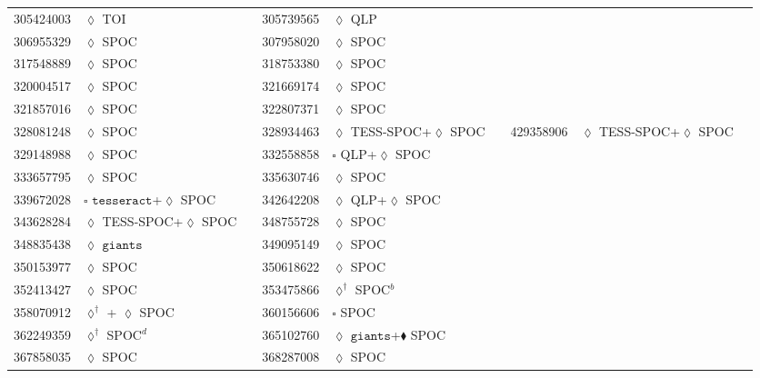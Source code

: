 \begin{longtable}{llrllr}
305424003 & $\lozenge$ TOI & \cite{TIC_154872375} & 305739565 & $\lozenge$ QLP & \cite{TIC_305739565} \\
306955329 & $\lozenge$ SPOC & \cite{TIC_232540264} & 307958020 & $\lozenge$ SPOC & \cite{TIC_307958020} \\
317548889 & $\lozenge$ SPOC & \cite{TIC_232540264} & 318753380 & $\lozenge$ SPOC & \cite{TIC_428699140} \\
320004517 & $\lozenge$ SPOC & \cite{TIC_320004517} & 321669174 & $\lozenge$ SPOC & \cite{TIC_126606859} \\
321857016 & $\lozenge$ SPOC & \cite{TIC_321857016} & 322807371 & $\lozenge$ SPOC & \cite{TIC_322807371} \\
328081248 & $\lozenge$ SPOC & \cite{TIC_159418353} & 328934463 & $\lozenge$ TESS-SPOC+$\lozenge$ SPOC & \cite{TIC_268532343} & 429358906 & $\lozenge$ TESS-SPOC+$\lozenge$ SPOC & \cite{TIC_343628284} \\
329148988 & $\lozenge$ SPOC & \cite{TIC_329148988} & 332558858 & $\square$ QLP+$\lozenge$ SPOC & \cite{TIC_332558858} \\
333657795 & $\lozenge$ SPOC & \cite{TIC_333657795} & 335630746 & $\lozenge$ SPOC & \cite{TIC_335630746} \\
339672028 & $\square$ $\texttt{tesseract}$+$\lozenge$ SPOC & \cite{TIC_66561343} & 342642208 & $\lozenge$ QLP+$\lozenge$ SPOC & \cite{TIC_393831507} \\
343628284 & $\lozenge$ TESS-SPOC+$\lozenge$ SPOC & \cite{TIC_343628284} & 348755728 & $\lozenge$ SPOC & \cite{TIC_348755728} \\
348835438 & $\lozenge$ $\texttt{giants}$ & \cite{TIC_348835438} & 349095149 & $\lozenge$ SPOC & \cite{TIC_349095149} \\
350153977 & $\lozenge$ SPOC & \cite{TIC_350153977} & 350618622 & $\lozenge$ SPOC & \cite{TIC_350618622} \\
352413427 & $\lozenge$ SPOC & \cite{TIC_232540264} & 353475866 & $\lozenge^\dagger$ SPOC$^b$ & \cite{TIC_10837041} \\
358070912 & $\lozenge^\dagger$ + $\lozenge$ SPOC & \cite{TIC_358070912} & 360156606 & $\square$ SPOC & \cite{TIC_360156606} \\
362249359 & $\lozenge^\dagger$ SPOC$^d$ & \cite{TIC_10837041} & 365102760 & $\lozenge$ $\texttt{giants}$+$\blacklozenge$ SPOC & \cite{TIC_365102760} \\
367858035 & $\lozenge$ SPOC & \cite{TIC_232540264} & 368287008 & $\lozenge$ SPOC & \cite{TIC_368287008} \\

\end{longtable}
